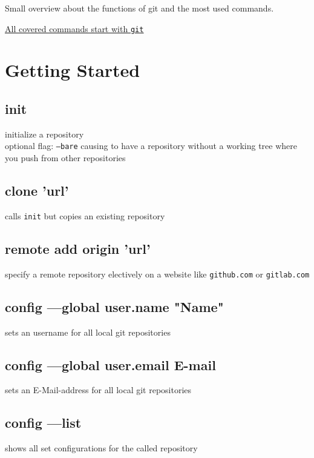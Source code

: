 Small overview about the functions of git and the most used commands.
\begin{center}
	\underline{\underline{All covered commands start with \texttt{git}}}\\
\end{center}

\section*{Getting Started}


\subsection*{init} 
initialize a repository\\
optional flag: \texttt{---bare} causing to have 
a repository without a working tree where you push from other repositories \\ 

\subsection*{clone 'url'}
calls \texttt{init} but copies an existing repository\\

\subsection*{remote add origin 'url'}
specify a remote repository electively on a website like \texttt{github.com} or \texttt{gitlab.com}\\

\subsection*{config ---global user.name "Name"}
sets an username for all local git repositories\\

\subsection*{config ---global user.email E-mail}
sets an E-Mail-address for all local git repositories\\

\subsection*{config ---list}
shows all set configurations for the called repository \\


